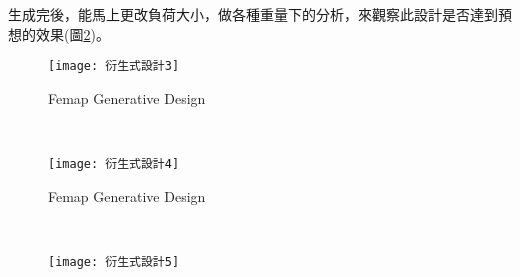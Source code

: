 生成完後，能馬上更改負荷大小，做各種重量下的分析，來觀察此設計是否達到預想的效果(圖\ref{3.19})。\\
\begin{figure}[hbt!]
\begin{center}
\texttt{[image: 衍生式設計3]}
\caption{\Large Femap Generative Design}\label{3.18}
\end{center}
\end{figure}
\\
\begin{figure}[hbt!]
\begin{center}
\texttt{[image: 衍生式設計4]}
\caption{\Large Femap Generative Design}\label{3.19}
\end{center}
\end{figure}
\\
\begin{figure}[hbt!]
\begin{center}
\texttt{[image: 衍生式設計5]}
\end{center}
\end{figure}
\\






\newpage